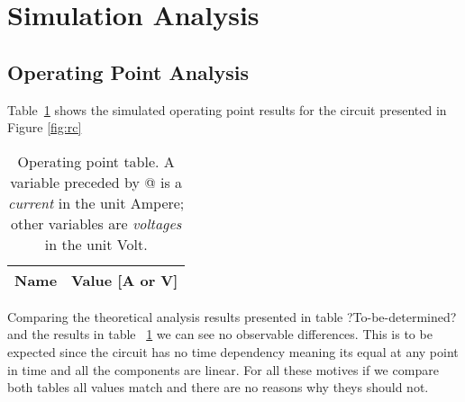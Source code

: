 \section{Simulation Analysis}
\label{sec:simulation}

\subsection{Operating Point Analysis}

Table~\ref{tab:op} shows the simulated operating point results for the circuit presented in Figure \ref{fig:rc}

\begin{table}[H]
  \centering
  \begin{tabular}{|l|r|}
    \hline    
    {\bf Name} & {\bf Value [A or V]} \\ \hline
    
  \end{tabular}
  \caption{Operating point table. A variable preceded by @ is a {\em current} in the unit Ampere; other variables are {\it voltages} in the unit Volt.}
  \label{tab:op}
\end{table}

Comparing the theoretical analysis results presented in table ?To-be-determined? and the results in table ~\ref{tab:op} we can see no observable differences. This is to be expected since the circuit has no time dependency meaning its equal at any point in time and all the components are linear. For all these motives if we compare both tables all values match and there are no reasons why theys should not.
